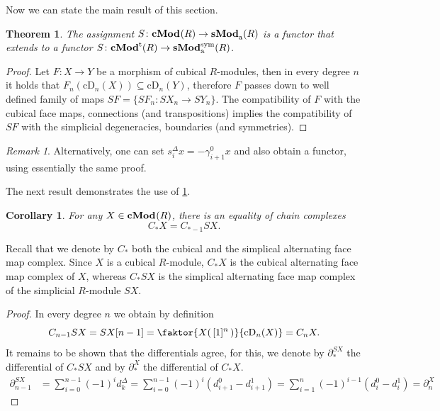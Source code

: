 \documentclass[12pt]{amsart}
\theoremstyle{plain}
\numberwithin{lemma}{\DefaultNumberTheoremWithin}
\numberwithin{claim}{\DefaultNumberTheoremWithin}
\newtheorem{theorem}{Theorem}
\numberwithin{theorem}{\DefaultNumberTheoremWithin}
\newtheorem{corollary}{Corollary}
\numberwithin{corollary}{\DefaultNumberTheoremWithin}
\numberwithin{proposition}{\DefaultNumberTheoremWithin}
\numberwithin{conjecture}{\DefaultNumberTheoremWithin}
\theoremstyle{definition}
\theoremstyle{definition}
\numberwithin{question}{\DefaultNumberTheoremWithin}
\theoremstyle{definition}
\numberwithin{problem}{\DefaultNumberTheoremWithin}
\theoremstyle{remark}
\newtheorem{remark}{Remark}
\numberwithin{remark}{\DefaultNumberTheoremWithin}
\theoremstyle{remark}
\numberwithin{example}{\DefaultNumberTheoremWithin}
\def\blt{*}
\def\one{[1]}
\def\sym{\textnormal{sym}}
\def\trp{\textnormal{t}}
\def\cDeg{\mathrm{cD}}     %
\def\Connection{\gamma}
\newcommand{\del}{\partial}
\newcommand{\sMod}[2]{\mathbf{sMod}_\textnormal{a}^{\textnormal{#1}}(#2)}  %
\newcommand{\cMod}[2]{\mathbf{cMod}^{\textnormal{#1}}(#2)}  %
\begin{document}
    Now we can state the main result of this section.
    
\begin{theorem}\label{FunctorThm}
    The assignment $S\colon\cMod{}{R} \to \sMod{}{R}$ is a functor that extends to a functor $S\colon\cMod{\trp}{R} \to \sMod{\sym}{R}$.
\end{theorem}
\begin{proof}
 Let $F\colon X\to Y$ be a morphism of cubical $R$-modules, then in every degree $n$ it holds that $F_n(\cDeg_n(X))\subseteq \cDeg_n(Y)$, therefore $F$ passes down to well defined family of maps $SF=\{SF_n\colon SX_n\to SY_n\}$. The compatibility of $F$ with the cubical face maps, connections (and  transpositions) implies the compatibility of $SF$ with the simplicial degeneracies, boundaries (and symmetries).
\end{proof}

\begin{remark}
    Alternatively, one can set $s_i^\Delta x=-\Connection_{i+1}^0 x$ and also obtain a functor, using essentially the same proof.
\end{remark}

The next result demonstrates the use of \ref{FunctorThm}.


\begin{corollary}\label{ComplexAndSCorollary}
    For any $X\in \cMod{}{R}$, there is an equality of chain complexes
    \[
    C_\blt X = C_{\blt-1}SX .
    \]
    

\end{corollary}
Recall that we denote by $C_\blt$ both the cubical and the simplical alternating face map complex. Since $X$ is a cubical $R$-module, $C_\blt X$ is the cubical alternating face map complex of $X$, whereas $C_\blt SX$ is the simplical alternating face map complex of the simplicial $R$-module $SX$.
\begin{proof}
    In every degree $n$ we obtain by definition
    \[
    C_{n-1}SX = SX[n-1] = \faktor{X(\,\one^{n}\,)}{\cDeg_n(X)} = C_nX.
    \]
    It remains to be shown that the differentials agree, for this, we denote by $\del^{SX}_*$ the differential of $C_{*}SX$ and by $\del^X_*$ the differential of $C_*X$. 
    \begin{align*}
    \del^{SX}_{n-1}&=\sum_{i=0}^{n-1}(-1)^{i} d_{k}^\Delta
    =\sum_{i=0}^{n-1}(-1)^{i} (d_{i+1}^0-d_{i+1}^1)
    =\sum_{i=1}^{n}(-1)^{i-1} (d_{i}^0-d_{i}^1)
    =\del^X_n
    \end{align*}
\end{proof}
\end{document}
